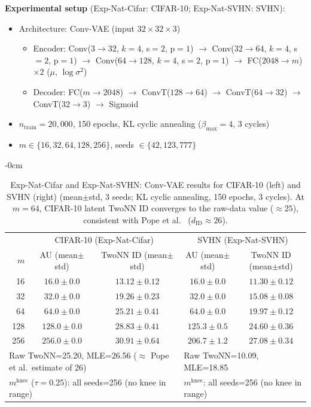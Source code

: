 \documentclass[make,article,submit,pdftex,moreauthors]{Definitions/mdpi}
\newcommand{\mknee}{m^{\mathrm{knee}}}
\begin{document}
\textbf{Experimental setup} (Exp-Nat-Cifar: CIFAR-10; Exp-Nat-SVHN: SVHN):
\begin{itemize}
  \item Architecture: Conv-VAE (input $32 \times 32 \times 3$)
        \begin{itemize}
          \item Encoder: Conv($3\to32$, $k=4$, s$=2$, p$=1$) $\to$ Conv($32\to64$, $k=4$, s$=2$, p$=1$) $\to$
                Conv($64\to128$, $k=4$, s$=2$, p$=1$) $\to$ FC($2048 \to m$) $\times 2$ ($\mu$, $\log\sigma^2$)
          \item Decoder: FC($m \to 2048$) $\to$ ConvT($128\to64$) $\to$ ConvT($64\to32$) $\to$ ConvT($32\to3$) $\to$ Sigmoid
        \end{itemize}
  \item $n_{\mathrm{train}} = 20{,}000$, 150 epochs, KL cyclic annealing ($\beta_{\max}=4$, 3 cycles)
  \item $m \in \{16, 32, 64, 128, 256\}$, seeds $\in \{42, 123, 777\}$
\end{itemize}

\begin{table}[H]
\begin{adjustwidth}{-\extralength}{0cm}
\centering
\caption{Exp-Nat-Cifar and Exp-Nat-SVHN: Conv-VAE results for CIFAR-10 (left) and SVHN (right) (mean$\pm$std, 3 seeds; KL cyclic annealing, 150 epochs, 3 cycles). At $m=64$, CIFAR-10 latent TwoNN ID converges to the raw-data value ($\approx25$), consistent with Pope et al.\ \cite{pope2021intrinsic} ($d_\mathrm{ID} \approx 26$).}
\label{tab:ei_ej}
\small
\begin{tabular}{r cc | cc}
\toprule
 & \multicolumn{2}{c|}{CIFAR-10 (Exp-Nat-Cifar)} & \multicolumn{2}{c}{SVHN (Exp-Nat-SVHN)} \\
$m$ & AU (mean$\pm$std) & TwoNN ID (mean$\pm$std) & AU (mean$\pm$std) & TwoNN ID (mean$\pm$std) \\
\midrule
 16  & $16.0\pm0.0$ & $13.12\pm0.12$ & $16.0\pm0.0$ & $11.30\pm0.12$ \\
 32  & $32.0\pm0.0$ & $19.26\pm0.23$ & $32.0\pm0.0$ & $15.08\pm0.08$ \\
 64  & $64.0\pm0.0$ & $\mathbf{25.21\pm0.41}$ & $64.0\pm0.0$ & $19.97\pm0.12$ \\
128  & $128.0\pm0.0$ & $28.83\pm0.41$ & $125.3\pm0.5$ & $24.60\pm0.36$ \\
256  & $256.0\pm0.0$ & $30.91\pm0.64$ & $206.7\pm1.2$ & $27.08\pm0.34$ \\
\midrule
\multicolumn{3}{l|}{Raw TwoNN=25.20, MLE=26.56 ($\approx$ Pope et al.\ estimate of 26)} & \multicolumn{2}{l}{Raw TwoNN=10.09, MLE=18.85} \\
\multicolumn{3}{l|}{$\mknee$ ($\tau=0.25$): all seeds=256 (no knee in range)} & \multicolumn{2}{l}{$\mknee$: all seeds=256 (no knee in range)} \\
\bottomrule
\end{tabular}
\end{adjustwidth}
\end{table}
\end{document}
